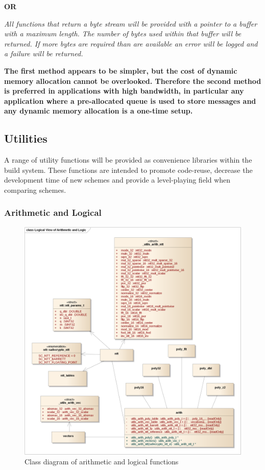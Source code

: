 \textbf{OR}

\textit{All functions that return a byte stream will be provided with a pointer to a buffer with a maximum length. The number of bytes used within that buffer will be returned. If more bytes are required than are available an error will be logged and a failure will be returned.}

\textbf{The first method appears to be simpler, but the cost of dynamic memory allocation cannot be overlooked. Therefore the second method is preferred in applications with high bandwidth, in particular any application where a pre-allocated queue is used to store messages and any dynamic memory allocation is a one-time setup.}


\newpage
\subsection{Utilities}

A range of utility functions will be provided as convenience libraries within the build system. These functions are intended to promote code-reuse, decrease the development time of new schemes and provide a level-playing field when comparing schemes.

\subsubsection{Arithmetic and Logical}

\begin{figure}[!h]
\centering
\includegraphics[width=\textwidth]{libsafecrypto_arith_logical_view.png}
\caption{Class diagram of arithmetic and logical functions}
\label{fig:safecrypto_alu}
\end{figure}

